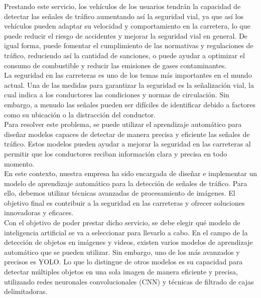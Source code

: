 Prestando este servicio, los vehículos de los usuarios tendrán la capacidad de detectar las señales de tráfico aumentando así la seguridad vial, ya que así los vehículos pueden adaptar su velocidad y comportamiento en la carretera, lo que puede reducir el riesgo de accidentes y mejorar la seguridad vial en general. De igual forma, puede fomentar el cumplimiento de las normativas y regulaciones de tráfico, reduciendo así la cantidad de sanciones, o puede ayudar a optimizar el consumo de combustible y reducir las emisiones de gases contaminantes.\\

La seguridad en las carreteras es uno de los temas más importantes en el mundo actual. Una de las medidas para garantizar la seguridad es la señalización vial, la cual indica a los conductores las condiciones y normas de circulación. Sin embargo, a menudo las señales pueden ser difíciles de identificar debido a factores como su ubicación o la distracción del conductor.\\

Para resolver este problema, se puede utilizar el aprendizaje automático para diseñar modelos capaces de detectar de manera precisa y eficiente las señales de tráfico. Estos modelos pueden ayudar a mejorar la seguridad en las carreteras al permitir que los conductores reciban información clara y precisa en todo momento.\\

En este contexto, nuestra empresa ha sido encargada de diseñar e implementar un modelo de aprendizaje automático para la detección de señales de tráfico. Para ello, debemos utilizar técnicas avanzadas de procesamiento de imágenes. El objetivo final es contribuir a la seguridad en las carreteras y ofrecer soluciones innovadoras y eficaces.\\

Con el objetivo de poder prestar dicho servicio, se debe elegir qué modelo de inteligencia artificial se va a seleccionar para llevarlo a cabo. En el campo de la detección de objetos en imágenes y videos, existen varios modelos de aprendizaje automático que se pueden utilizar. Sin embargo, uno de los más avanzados y precisos es YOLO. Lo que lo distingue de otros modelos es su capacidad para detectar múltiples objetos en una sola imagen de manera eficiente y precisa, utilizando redes neuronales convolucionales (CNN) y técnicas de filtrado de cajas delimitadoras. \\

